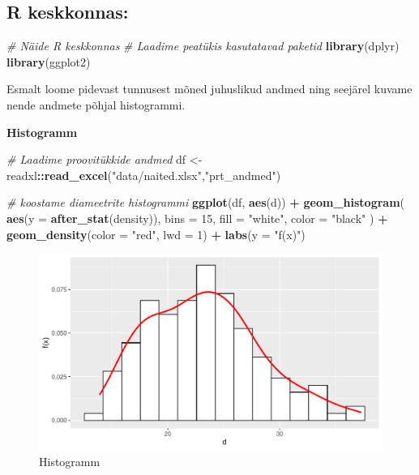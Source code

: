 \documentclass[
]{book}
\newenvironment{Shaded}{\begin{snugshade}}{\end{snugshade}}
\newcommand{\AttributeTok}[1]{\textcolor[rgb]{0.13,0.29,0.53}{#1}}
\newcommand{\CommentTok}[1]{\textcolor[rgb]{0.56,0.35,0.01}{\textit{#1}}}
\newcommand{\DecValTok}[1]{\textcolor[rgb]{0.00,0.00,0.81}{#1}}
\newcommand{\FunctionTok}[1]{\textcolor[rgb]{0.13,0.29,0.53}{\textbf{#1}}}
\newcommand{\NormalTok}[1]{#1}
\newcommand{\OtherTok}[1]{\textcolor[rgb]{0.56,0.35,0.01}{#1}}
\newcommand{\SpecialCharTok}[1]{\textcolor[rgb]{0.81,0.36,0.00}{\textbf{#1}}}
\newcommand{\StringTok}[1]{\textcolor[rgb]{0.31,0.60,0.02}{#1}}
\renewenvironment{Shaded} {\begin{snugshade}\footnotesize} {\end{snugshade}}
\begin{document}
\subsection{R keskkonnas:}\label{r-keskkonnas}

\begin{Shaded}
\begin{Highlighting}[]
\CommentTok{\# Näide R keskkonnas}
\CommentTok{\# Laadime peatükis kasutatavad paketid}
\FunctionTok{library}\NormalTok{(dplyr)}
\FunctionTok{library}\NormalTok{(ggplot2)}
\end{Highlighting}
\end{Shaded}

Esmalt loome pidevast tunnusest mõned juhuslikud andmed ning seejärel kuvame nende andmete põhjal histogrammi.

\textbf{Histogramm}

\begin{Shaded}
\begin{Highlighting}[]
\CommentTok{\# Laadime proovitükkide andmed}
\NormalTok{df }\OtherTok{\textless{}{-}}\NormalTok{ readxl}\SpecialCharTok{::}\FunctionTok{read\_excel}\NormalTok{(}\StringTok{"data/naited.xlsx"}\NormalTok{,}\StringTok{"prt\_andmed"}\NormalTok{)}

\CommentTok{\# koostame diameetrite histogrammi}
\FunctionTok{ggplot}\NormalTok{(df, }\FunctionTok{aes}\NormalTok{(d)) }\SpecialCharTok{+}
  \FunctionTok{geom\_histogram}\NormalTok{(}
    \FunctionTok{aes}\NormalTok{(}\AttributeTok{y =} \FunctionTok{after\_stat}\NormalTok{(density)),}
    \AttributeTok{bins =} \DecValTok{15}\NormalTok{,}
    \AttributeTok{fill =} \StringTok{"white"}\NormalTok{,}
    \AttributeTok{color =} \StringTok{"black"}
\NormalTok{  ) }\SpecialCharTok{+}
  \FunctionTok{geom\_density}\NormalTok{(}\AttributeTok{color =} \StringTok{"red"}\NormalTok{, }\AttributeTok{lwd =} \DecValTok{1}\NormalTok{) }\SpecialCharTok{+}
  \FunctionTok{labs}\NormalTok{(}\AttributeTok{y =} \StringTok{"f(x)"}\NormalTok{)}
\end{Highlighting}
\end{Shaded}

\begin{figure}[H]
\includegraphics[width=0.8\linewidth]{_main_files/figure-latex/unnamed-chunk-22-1} \caption{Histogramm}\label{fig:unnamed-chunk-22}
\end{figure}
\end{document}

